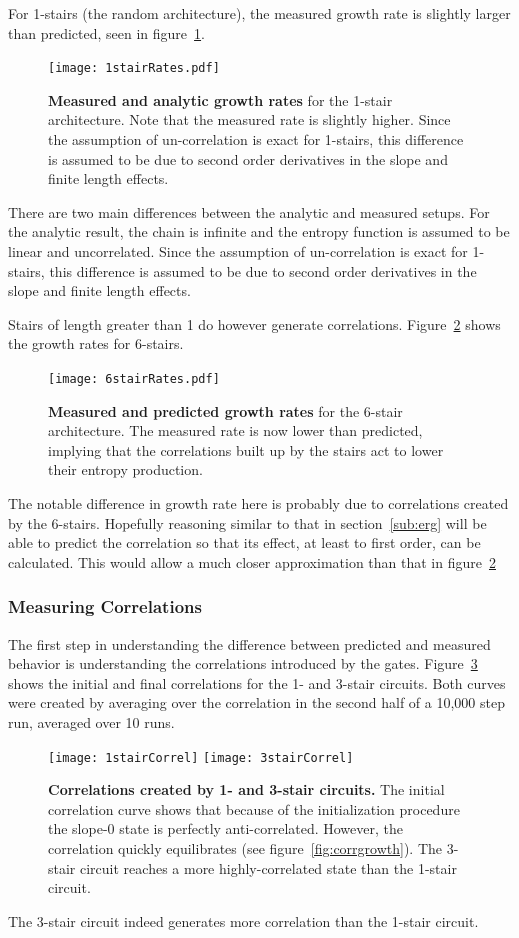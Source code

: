 For 1-stairs (the random architecture), the measured growth rate is slightly larger than predicted, seen in figure~\ref{fig:1stairRates}.
\begin{figure}
	\centering
	\texttt{[image: 1stairRates.pdf]}
	\caption{\textbf{Measured and analytic growth rates} for the 1-stair architecture. Note that the measured rate is slightly higher. Since the assumption of un-correlation is exact for 1-stairs, this difference is assumed to be due to second order derivatives in the slope and finite length effects.}
	\label{fig:1stairRates}
\end{figure}
There are two main differences between the analytic and measured setups. For the analytic result, the chain is infinite and the entropy function is assumed to be linear and uncorrelated. Since the assumption of un-correlation is exact for 1-stairs, this difference is assumed to be due to second order derivatives in the slope and finite length effects.

Stairs of length greater than 1 do however generate correlations. Figure~\ref{fig:6stairRates} shows the growth rates for 6-stairs. 
\begin{figure}
	\centering
	\texttt{[image: 6stairRates.pdf]}
	\caption{\textbf{Measured and predicted growth rates} for the 6-stair architecture. The measured rate is now lower than predicted, implying that the correlations built up by the stairs act to lower their entropy production.}
	\label{fig:6stairRates}
\end{figure}
The notable difference in growth rate here is probably due to correlations created by the 6-stairs. Hopefully reasoning similar to that in section~\ref{sub:erg} will be able to predict the correlation so that its effect, at least to first order, can be calculated. This would allow a much closer approximation than that in figure~\ref{fig:6stairRates}

\subsubsection{Measuring Correlations} \emph{} \label{subsub:correlations}

The first step in understanding the difference between predicted and measured behavior is understanding the correlations introduced by the gates. Figure~\ref{fig:stairCorrel} shows the initial and final correlations for the 1- and 3-stair circuits. Both curves were created by averaging over the correlation in the second half of a 10,000 step run, averaged over 10 runs.
\begin{figure}
	\centering
	\texttt{[image: 1stairCorrel]}
	\texttt{[image: 3stairCorrel]}
	\caption{\textbf{Correlations created by 1- and 3-stair circuits.} The initial correlation curve shows that because of the initialization procedure the slope-0 state is perfectly anti-correlated. However, the correlation quickly equilibrates (see figure~\ref{fig:corrgrowth}). The 3-stair circuit reaches a more highly-correlated state than the 1-stair circuit.}
	\label{fig:stairCorrel}
\end{figure}
The 3-stair circuit indeed generates more correlation than the 1-stair circuit. 

